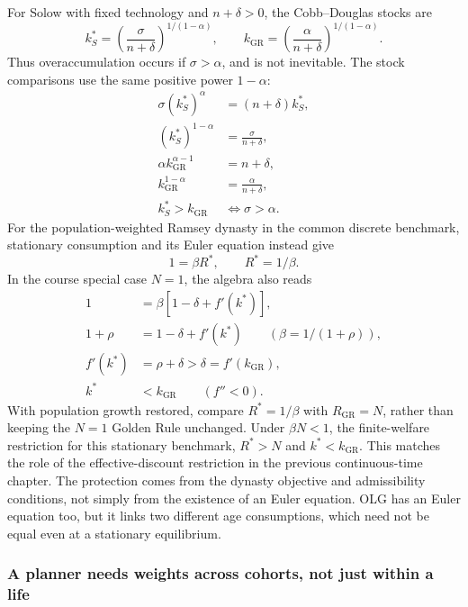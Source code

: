 For Solow with fixed technology and $n+\delta>0$, the Cobb--Douglas stocks are
\begin{equation}
k^*_{S}=\left(\frac{\sigma}{n+\delta}\right)^{1/(1-\alpha)},
\qquad
k_{\mathrm{GR}}=\left(\frac{\alpha}{n+\delta}\right)^{1/(1-\alpha)}.
\end{equation}
Thus overaccumulation occurs if $\sigma>\alpha$, and is not inevitable.
The stock comparisons use the same positive power $1-\alpha$:
\begin{align}
\sigma(k_S^*)^\alpha&=(n+\delta)k_S^*,\\
(k_S^*)^{1-\alpha}&=\frac{\sigma}{n+\delta},\\
\alpha k_{\mathrm{GR}}^{\alpha-1}&=n+\delta,\\
k_{\mathrm{GR}}^{1-\alpha}&=\frac{\alpha}{n+\delta},\\
k_S^*>k_{\mathrm{GR}}&\Longleftrightarrow\sigma>\alpha.
\end{align}
For the population-weighted Ramsey dynasty in the common discrete benchmark,
stationary consumption and its Euler equation instead give
\begin{equation}
1=\beta R^*,\qquad R^*=1/\beta.
\end{equation}
In the course special case $N=1$, the algebra also reads
\begin{align}
1&=\beta[1-\delta+f'(k^*)],\\
1+\rho&=1-\delta+f'(k^*)\qquad(\beta=1/(1+\rho)),\\
f'(k^*)&=\rho+\delta>\delta=f'(k_{\mathrm{GR}}),\\
k^*&<k_{\mathrm{GR}}\qquad(f''<0).
\end{align}
With population growth restored, compare $R^*=1/\beta$ with
$R_{\mathrm{GR}}=N$, rather than keeping the $N=1$ Golden Rule unchanged.
Under $\beta N<1$, the finite-welfare restriction for this stationary
benchmark, $R^*>N$ and $k^*<k_{\mathrm{GR}}$. This matches the role of the
effective-discount restriction in the previous continuous-time chapter.
The protection comes from the dynasty objective and admissibility conditions,
not simply from the existence of an Euler equation. OLG has an Euler equation
too, but it links two different age consumptions, which need not be equal
even at a stationary equilibrium.

\subsubsection{A planner needs weights across cohorts, not just within a life}

